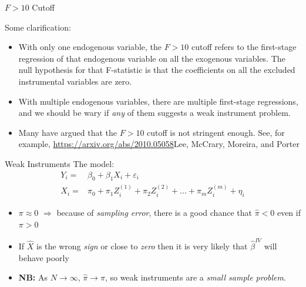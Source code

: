 \documentclass[aspectratio=169,11pt]{beamer}
\begin{document}
\begin{frame}{$F>10$ Cutoff}

Some clarification:

\begin{itemize}
		\item With only one endogenous variable, the $F>10$ cutoff refers to the first-stage regression of
		that endogenous variable on all the exogenous variables. The null hypothesis for that F-statistic is that
		the coefficients on all the excluded instrumental variables are zero.

		\medskip
		\item With multiple endogenous variables, there are multiple first-stage regressions, and we should 
		be wary if \emph{any} of them suggests a weak instrument problem.
		\medskip
		\item Many have argued that the $F>10$ cutoff is not stringent enough. See, for example, 
		\url{https://arxiv.org/abs/2010.05058}{Lee, McCrary, Moreira, and Porter} 

\end{itemize}
\end{frame}


\begin{frame}{Weak Instruments}
The model:
\begin{align*}
	Y_i =& \beta_0 + \beta_1 X_i + \varepsilon_i\\
	X_i =& \pi_0 + \pi_1 Z_i^{(1)} + \pi_2 Z_i^{(2)} + ... + \pi_m Z_i^{(m)}+ \eta_i
\end{align*}

	\begin{itemize}
		\item $\pi\approx 0$ $\Rightarrow$ because of \emph{sampling error}, there is a good chance that $\hat\pi<0$ even if $\pi>0$
		\item If $\hat X$ is the wrong \emph{sign} or close to \emph{zero} then it is very likely that $\hat\beta^{IV}$ will behave poorly
		\item {\bf NB:} As $N\to\infty$, $\hat\pi\to\pi$, so weak instruments are a \emph{small sample problem}.
	\end{itemize}
\end{frame}
\end{document}

